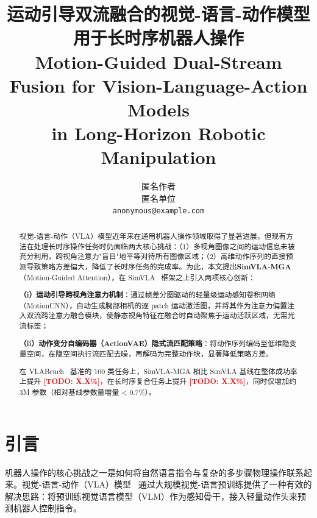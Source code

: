 \documentclass[10pt,twocolumn]{article}
\newcommand{\todo}[1]{\textcolor{red}{\textbf{[TODO: #1]}}}
\begin{document}
\title{\textbf{运动引导双流融合的视觉-语言-动作模型\\用于长时序机器人操作}\\[4pt]
  \large Motion-Guided Dual-Stream Fusion for Vision-Language-Action Models\\
  in Long-Horizon Robotic Manipulation}

\author{
  匿名作者\\
  匿名单位\\
  \texttt{anonymous@example.com}
}

\date{}
\maketitle
\thispagestyle{empty}

\begin{abstract}
视觉-语言-动作（VLA）模型近年来在通用机器人操作领域取得了显著进展，但现有方法在处理长时序操作任务时仍面临两大核心挑战：（1）多视角图像之间的运动信息未被充分利用，跨视角注意力"盲目"地平等对待所有图像区域；（2）高维动作序列的直接预测导致策略方差偏大，降低了长时序任务的完成率。为此，本文提出\textbf{SimVLA-MGA}（Motion-Guided Attention），在 SimVLA~\cite{simvla2026} 框架之上引入两项核心创新：

\textbf{（i）运动引导跨视角注意力机制}：通过帧差分图驱动的轻量级运动感知卷积网络（MotionCNN），自动生成腕部相机的逐 patch 运动激活图，并将其作为注意力偏置注入双流跨注意力融合模块，使静态视角特征在融合时自动聚焦于运动活跃区域，无需光流标签；

\textbf{（ii）动作变分自编码器（ActionVAE）隐式流匹配策略}：将动作序列编码至低维隐变量空间，在隐空间执行流匹配去噪，再解码为完整动作块，显著降低策略方差。

在 VLABench~\cite{vlabench2025} 基准的 100 类任务上，SimVLA-MGA 相比 SimVLA 基线在整体成功率上提升 \todo{X.X\%}，在长时序复合任务上提升 \todo{X.X\%}，同时仅增加约 3M 参数（相对基线参数量增量 < 0.7\%）。
\end{abstract}

\section{引言}
\label{sec:intro}

机器人操作的核心挑战之一是如何将自然语言指令与复杂的多步骤物理操作联系起来。视觉-语言-动作（VLA）模型~\cite{openvla,rt2,pi0,simvla2026} 通过大规模视觉-语言预训练提供了一种有效的解决思路：将预训练视觉语言模型（VLM）作为感知骨干，接入轻量动作头来预测机器人控制指令。
\end{document}

